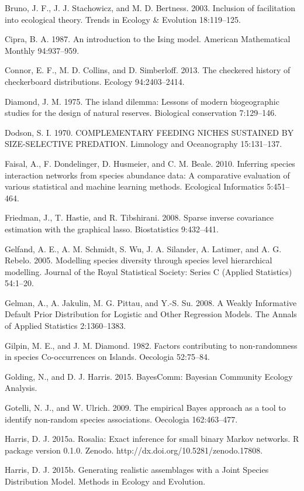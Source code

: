 \documentclass[12pt,]{article}
\begin{document}
\begin{spacing}{1.9}
\begin{flushleft}
Bruno, J. F., J. J. Stachowicz, and M. D. Bertness. 2003. Inclusion of
facilitation into ecological theory. Trends in Ecology \& Evolution
18:119--125.

Cipra, B. A. 1987. An introduction to the Ising model. American
Mathematical Monthly 94:937--959.

Connor, E. F., M. D. Collins, and D. Simberloff. 2013. The checkered
history of checkerboard distributions. Ecology 94:2403--2414.

Diamond, J. M. 1975. The island dilemma: Lessons of modern biogeographic
studies for the design of natural reserves. Biological conservation
7:129--146.

Dodson, S. I. 1970. COMPLEMENTARY FEEDING NICHES SUSTAINED BY
SIZE-SELECTIVE PREDATION. Limnology and Oceanography 15:131--137.

Faisal, A., F. Dondelinger, D. Husmeier, and C. M. Beale. 2010.
Inferring species interaction networks from species abundance data: A
comparative evaluation of various statistical and machine learning
methods. Ecological Informatics 5:451--464.

Friedman, J., T. Hastie, and R. Tibshirani. 2008. Sparse inverse
covariance estimation with the graphical lasso. Biostatistics
9:432--441.

Gelfand, A. E., A. M. Schmidt, S. Wu, J. A. Silander, A. Latimer, and A.
G. Rebelo. 2005. Modelling species diversity through species level
hierarchical modelling. Journal of the Royal Statistical Society: Series
C (Applied Statistics) 54:1--20.

Gelman, A., A. Jakulin, M. G. Pittau, and Y.-S. Su. 2008. A Weakly
Informative Default Prior Distribution for Logistic and Other Regression
Models. The Annals of Applied Statistics 2:1360--1383.

Gilpin, M. E., and J. M. Diamond. 1982. Factors contributing to
non-randomness in species Co-occurrences on Islands. Oecologia
52:75--84.

Golding, N., and D. J. Harris. 2015. BayesComm: Bayesian Community
Ecology Analysis.

Gotelli, N. J., and W. Ulrich. 2009. The empirical Bayes approach as a
tool to identify non-random species associations. Oecologia
162:463--477.

Harris, D. J. 2015a. Rosalia: Exact inference for small binary Markov
networks. R package version 0.1.0. Zenodo.
http://dx.doi.org/10.5281/zenodo.17808.

Harris, D. J. 2015b. Generating realistic assemblages with a Joint
Species Distribution Model. Methods in Ecology and Evolution.


\end{flushleft}
\end{spacing}
\end{document}
